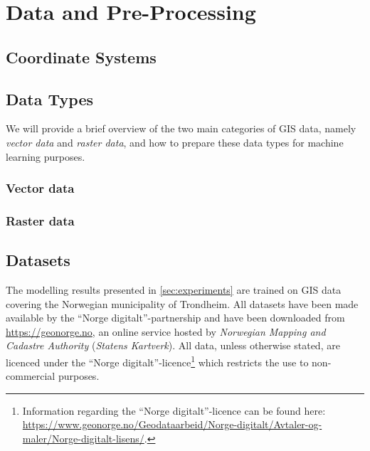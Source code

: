 \chapter{Data and Pre-Processing}%
\label{sec:data}



\section{Coordinate Systems}%
\label{sec:coordinate-systems}


\section{Data Types}%
\label{sec:data-types}

We will provide a brief overview of the two main categories of GIS data, namely \textit{vector data} and \textit{raster data}, and how to prepare these data types for machine learning purposes.

\subsection{Vector data}%
\label{sec:vector-data}


\subsection{Raster data}%
\label{sec:raster-data}


\section{Datasets}%
\label{sec:data-sets}

The modelling results presented in \cref{sec:experiments} are trained on GIS data covering the Norwegian municipality of Trondheim.
All datasets have been made available by the \enquote{Norge digitalt}-partnership and have been downloaded from \url{https://geonorge.no}, an online service hosted by \textit{Norwegian Mapping and Cadastre Authority} (\textit{Statens Kartverk}).
All data, unless otherwise stated, are licenced under the \enquote{Norge digitalt}-licence\footnote{Information regarding the \enquote{Norge digitalt}-licence can be found here: \url{https://www.geonorge.no/Geodataarbeid/Norge-digitalt/Avtaler-og-maler/Norge-digitalt-lisens/}.} which restricts the use to non-commercial purposes.

